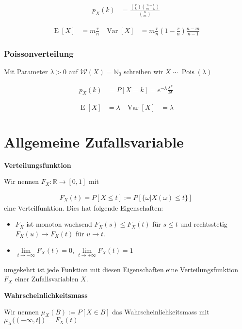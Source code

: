 \documentclass[25pt]{sciposter}
\newcommand{\R}{\mathbb{R}}
\newcommand{\N}{\mathbb{N}}
\newcommand{\W}{\mathcal{W}}
\newcommand{\Var}{\operatorname{Var}}
\newcommand{\E}{\operatorname{E}}
\newenvironment{method}[1]{\begin{mdframed}[backgroundcolor=blue!10,innertopmargin=15pt, innerbottommargin=15pt,nobreak=true]
		\textbf{#1 }
	}
	{ 
	\end{mdframed}
}
\begin{document}
\begin{multicols}{3}
\begin{align*}
	p_X(k) &= \frac{{r\choose k} {n-r \choose m-k}}{{n \choose m}}
\end{align*}

\begin{align*}
\E[X] &= m\frac{r}{n} & \Var[X] &= m\frac{r}{n}\left(1-\frac{r}{n}\right) \frac{n-m}{n-1}
\end{align*}



\subsubsection*{Poissonverteilung}

Mit Parameter $\lambda>0$ auf $\W(X) = \N_0$ schreiben wir $X\sim {\operatorname{Pois}}(\lambda)$

\begin{align*}
	p_X(k) &= P[X = k] = e^{-\lambda} \frac{\lambda^k}{k!}
\end{align*}

\begin{align*}
\E[X] &= \lambda & \Var[X] &= \lambda
\end{align*}




\section{Allgemeine Zufallsvariable}



\begin{method}{Verteilungsfunktion}
	Wir nennen $F_X : \R \to [0,1]$ mit 
	
	\begin{align*}
		F_X (t) = P[X\leq t]:= P[\{\omega | X(\omega) \leq t\}]
	\end{align*}
	eine Verteilfunktion. Dies hat folgende Eigenschaften:
	\begin{itemize}
		\item $F_X$ ist monoton wachsend $F_X(s)\leq F_X(t)$ für $s\leq t$ und rechtsstetig $F_X(u) \to F_X(t)$ für $u \to t$.
		\item $\lim\limits_{t\to-\infty} F_X(t) = 0$, $\lim\limits_{t\to + \infty} F_X(t) = 1$ 
	\end{itemize}
	umgekehrt ist jede Funktion mit diesen Eigenschaften eine Verteilungsfunktion $F_X$ einer Zufallsvariablen $X$.
\end{method}


\begin{method}{Wahrscheinlichkeitsmass}
	Wir nennen $\mu_X(B) := P[X \in B]$ das Wahrscheinlichkeitsmass mit $\mu_X((-\infty,t]) = F_X(t)$
\end{method}


\end{multicols}
\end{document}
